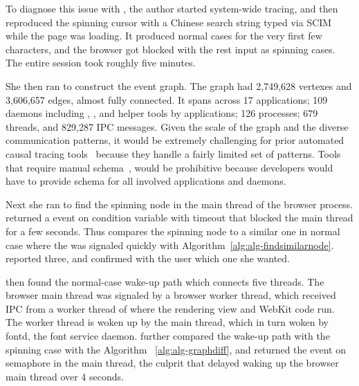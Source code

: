 To diagnose this issue with \xxx, the author started system-wide tracing, and
then reproduced the spinning cursor with a Chinese search string typed via SCIM
while the page was loading. It produced normal cases for the very first few
characters, and the browser got blocked with the rest input as spinning cases.
The entire session took roughly five minutes.

She then ran \xxx to construct the event graph. The graph had 2,749,628 vertexes
and 3,606,657 edges, almost fully connected. It spans across 17 applications;
109 daemons including , ,  and
helper tools by applications; 126 processes; 679 threads, and 829,287
IPC messages. Given the scale of the graph and the diverse communication
patterns, it would be extremely challenging for prior automated causal tracing
tools~\cite{aguilera2003performance, zhang2013panappticon, attariyan2012x,
cohen2004correlating} because they handle a fairly limited set of patterns.
Tools that require manual schema~\cite{barham2004using, reynolds2006pip}, would
be prohibitive because developers would have to provide schema for all involved
applications and daemons.

Next she ran \xxx to find the spinning node in the main thread of the browser
process. \xxx returned a  event on condition variable with timeout that
blocked the main thread for a few seconds. Thus \xxx compares the spinning node
to a similar one in normal case where the  was signaled quickly with
Algorithm~\ref{alg:alg-findsimilarnode}. \xxx reported three, and confirmed with
the user which one she wanted.

\xxx then found the normal-case wake-up path which connects five threads. The
browser main thread was signaled by a browser worker thread, which received IPC
from a worker thread of  where the rendering view and WebKit code
run. The worker thread is woken up by the  main thread, which in
turn woken by fontd, the font service daemon. \xxx further compared the wake-up
path with the spinning case with the Algorithm ~\ref{alg:alg-graphdiff}, and
returned the  event on semaphore in the  main thread, the
culprit that delayed waking up the browser main thread over 4 seconds.

